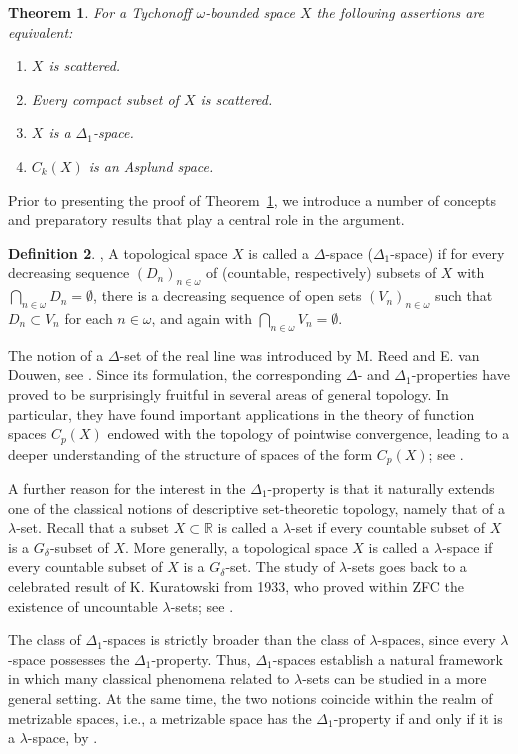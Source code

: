 \documentclass[12pt]{amsart}
\theoremstyle{plain}
\newtheorem{theorem}{Theorem}[section]
\theoremstyle{definition}
\newtheorem{definition}[theorem]{Definition}
\theoremstyle{remark}
\begin{document}
\begin{theorem} \cite{KKuL} \label{mainIII}
For a Tychonoff $\omega$-bounded space $X$ the following assertions are equivalent:
\begin{enumerate}
\item $X$ is scattered.
\item Every compact subset of $X$ is scattered.
\item $X$ is a $\Delta_1$-space.
\item $C_k(X)$ is an Asplund space.
\end{enumerate}
\end{theorem}
Prior to presenting the proof of Theorem~\ref{mainIII}, we introduce a number of concepts and preparatory results that play a central role in the argument.
\begin{definition} \cite{KKuL1}, \cite{KL1}
A topological  space $X$ is called a $\Delta$-space  ($\Delta_1$-space) if for every decreasing sequence $(D_n)_{n\in\omega}$
of (countable, respectively) subsets of $X$ with $\bigcap_{n\in\omega}D_n=\emptyset$, there is a decreasing sequence of open sets $(V_n)_{n\in\omega}$ such that $D_n \subset V_n$
for each $n\in\omega$,
and again with $\bigcap_{n\in\omega}V_n=\emptyset$.
\end{definition}
The notion of a $\Delta$-set of the real line was introduced by M. Reed and E. van Douwen, see \cite{Reed}. Since its formulation, the corresponding $\Delta$- and $\Delta_1$-properties have proved to be surprisingly fruitful in several areas of general topology. In particular, they have found important applications in the theory of function spaces $C_p(X)$  endowed with the topology of pointwise convergence, leading to a deeper understanding of the structure of spaces of the form $C_p(X)$; see \cite{KKuL1, KL1}.

A further reason for the interest in the $\Delta_1$-property is that it naturally extends one of the classical notions of descriptive set-theoretic topology, namely that of a $\lambda$-set. Recall that a subset $X\subset\mathbb{R}$ is called a $\lambda$-set if every countable subset of $X$ is a $G_\delta$-subset of $X$. More generally, a topological space $X$ is called a $\lambda$-space if every countable subset of $X$ is a $G_\delta$-set. The study of $\lambda$-sets goes back to a celebrated result of K. Kuratowski from 1933, who proved within ZFC the existence of uncountable $\lambda$-sets; see \cite[Chapter~3, \S40.III]{k}.

The class of $\Delta_1$-spaces is strictly broader than the class of $\lambda$-spaces, since every $\lambda$-space possesses the $\Delta_1$-property. Thus, $\Delta_1$-spaces establish a natural framework in which many classical phenomena related to $\lambda$-sets can be studied in a more general setting. At the same time, the two notions coincide within the realm of metrizable spaces, i.e., a metrizable space has the $\Delta_1$-property if and only if it is a $\lambda$-space, by \cite[Theorem~2.19]{KKuL1}.
\end{document}
